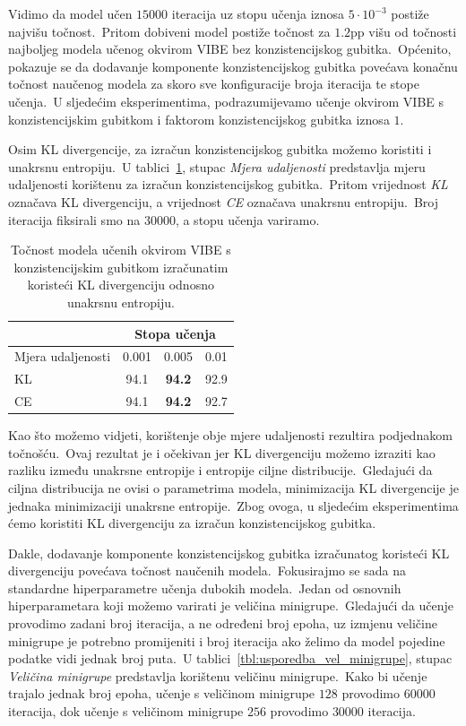 \documentclass[diplomskirad]{fer}
\begin{document}
Vidimo da model učen $15000$ iteracija uz stopu učenja iznosa $5 \cdot 10^{-3}$ postiže najvišu točnost.\ 
Pritom dobiveni model postiže točnost za $1.2$pp višu od točnosti najboljeg modela učenog okvirom VIBE bez konzistencijskog gubitka.\ 
Općenito, pokazuje se da dodavanje komponente konzistencijskog gubitka povećava konačnu točnost naučenog modela za skoro sve konfiguracije broja iteracija te stope učenja.\ 
U sljedećim eksperimentima, podrazumijevamo učenje okvirom VIBE s konzistencijskim gubitkom i faktorom konzistencijskog gubitka iznosa $1$.\ 

Osim KL divergencije, za izračun konzistencijskog gubitka možemo koristiti i unakrsnu entropiju.\ U tablici~\ref{tbl:usporedba_kl_vs_ce}, stupac \textit{Mjera udaljenosti} predstavlja mjeru udaljenosti korištenu za izračun konzistencijskog gubitka.\ 
Pritom vrijednost \textit{KL} označava KL divergenciju, a vrijednost \textit{CE} označava unakrsnu entropiju.\ Broj iteracija fiksirali smo na $30000$, a stopu učenja variramo.\ 

\begin{table}[htb]
  \caption{Točnost modela učenih okvirom VIBE s konzistencijskim gubitkom izračunatim koristeći KL divergenciju odnosno unakrsnu entropiju.}
  \label{tbl:usporedba_kl_vs_ce}
  \centering
  \begin{tabular}{l||ccc}
  & \multicolumn{3}{c}{Stopa učenja} \\ \hline
  Mjera udaljenosti & 0.001 & 0.005 & 0.01 \\ \hline \hline
  KL & 94.1 & \textbf{94.2} & 92.9 \\ 
  CE & 94.1 & \textbf{94.2} & 92.7 \\
  \end{tabular}
\end{table}

\pagebreak

Kao što možemo vidjeti, korištenje obje mjere udaljenosti rezultira podjednakom točnošću.\ Ovaj rezultat je i očekivan jer KL divergenciju možemo izraziti kao razliku između unakrsne entropije i entropije ciljne distribucije.\ 
Gledajući da ciljna distribucija ne ovisi o parametrima modela, minimizacija KL divergencije je jednaka minimizaciji unakrsne entropije.\
Zbog ovoga, u sljedećim eksperimentima ćemo koristiti KL divergenciju za izračun konzistencijskog gubitka.\ 

Dakle, dodavanje komponente konzistencijskog gubitka izračunatog koristeći KL divergenciju povećava točnost naučenih modela.\ 
Fokusirajmo se sada na standardne hiperparametre učenja dubokih modela.\ Jedan od osnovnih hiperparametara koji možemo varirati je veličina minigrupe.\ 
Gledajući da učenje provodimo zadani broj iteracija, a ne određeni broj epoha, uz izmjenu veličine minigrupe je potrebno promijeniti i broj iteracija ako želimo da model pojedine podatke vidi jednak broj puta.\ 
U tablici~\ref{tbl:usporedba_vel_minigrupe}, stupac \textit{Veličina minigrupe} predstavlja korištenu veličinu minigrupe.\ Kako bi učenje trajalo jednak broj epoha, učenje s veličinom minigrupe $128$ provodimo $60000$ iteracija, dok učenje s veličinom minigrupe $256$ provodimo $30000$ iteracija.\
\end{document}
